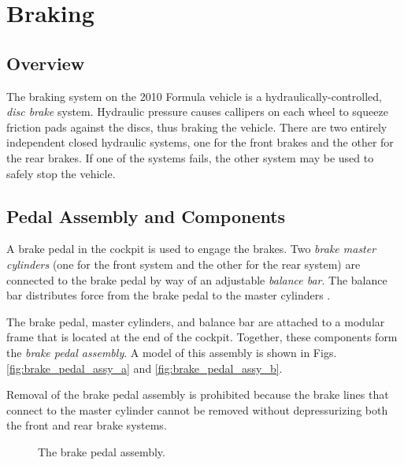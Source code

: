 \section{Braking}

\subsection{Overview}

The braking system on the 2010 Formula vehicle is a hydraulically-controlled, \emph{disc brake} system. Hydraulic pressure causes callipers on each wheel to squeeze friction pads against the discs, thus braking the vehicle. There are two entirely independent closed hydraulic systems, one for the front brakes and the other for the rear brakes. If one of the systems fails, the other system may be used to safely stop the vehicle.

\subsection{Pedal Assembly and Components}

A brake pedal in the cockpit is used to engage the brakes. Two \emph{brake master cylinders} (one for the front system and the other for the rear system) are connected to the brake pedal by way of an adjustable \emph{balance bar}. The balance bar distributes force from the brake pedal to the master cylinders \cite{TiltonBrakeBias}. 

The brake pedal, master cylinders, and balance bar are attached to a modular frame that is located at the end of the cockpit. Together, these components form the \emph{brake pedal assembly}. A model of this assembly is shown in Figs. \ref{fig:brake_pedal_assy_a} and \ref{fig:brake_pedal_assy_b}. 

Removal of the brake pedal assembly is prohibited because the brake lines that connect to the master cylinder cannot be removed without depressurizing both the front and rear brake systems. 

\begin{figure}[h!]
	\centering
    \caption{The brake pedal assembly.}
    \label{fig:brake_pedal_assy}
\end{figure}

